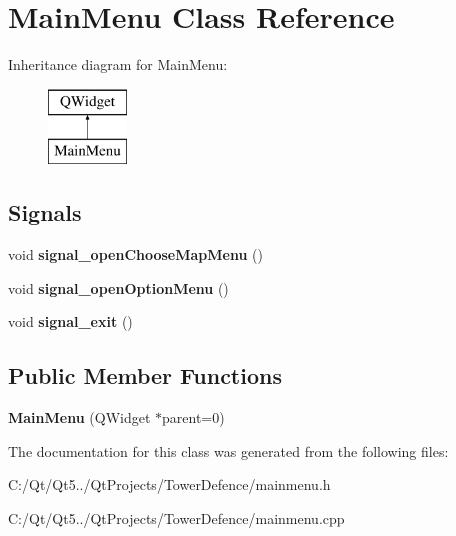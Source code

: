 \hypertarget{class_main_menu}{}\section{Main\+Menu Class Reference}
\label{class_main_menu}
Inheritance diagram for Main\+Menu\+:\begin{figure}[H]
\begin{center}
\leavevmode
\includegraphics[height=2.000000cm]{class_main_menu}
\end{center}
\end{figure}
\subsection*{Signals}
\begin{DoxyCompactItemize}
\item 
\hypertarget{class_main_menu_a06ebc0a911fa9987af5673c9bbe602a0}{}void {\bfseries signal\+\_\+open\+Choose\+Map\+Menu} ()\label{class_main_menu_a06ebc0a911fa9987af5673c9bbe602a0}

\item 
\hypertarget{class_main_menu_a39c62f3df829fb9e6969918bb9aa4728}{}void {\bfseries signal\+\_\+open\+Option\+Menu} ()\label{class_main_menu_a39c62f3df829fb9e6969918bb9aa4728}

\item 
\hypertarget{class_main_menu_a59da940e8207ed4f70f3c39a790efe50}{}void {\bfseries signal\+\_\+exit} ()\label{class_main_menu_a59da940e8207ed4f70f3c39a790efe50}

\end{DoxyCompactItemize}
\subsection*{Public Member Functions}
\begin{DoxyCompactItemize}
\item 
\hypertarget{class_main_menu_afb529c0c966839b1dfc7e18ed74e4d76}{}{\bfseries Main\+Menu} (Q\+Widget $\ast$parent=0)\label{class_main_menu_afb529c0c966839b1dfc7e18ed74e4d76}

\end{DoxyCompactItemize}


The documentation for this class was generated from the following files\+:\begin{DoxyCompactItemize}
\item 
C\+:/\+Qt/\+Qt5../\+Qt\+Projects/\+Tower\+Defence/mainmenu.\+h\item 
C\+:/\+Qt/\+Qt5../\+Qt\+Projects/\+Tower\+Defence/mainmenu.\+cpp\end{DoxyCompactItemize}
